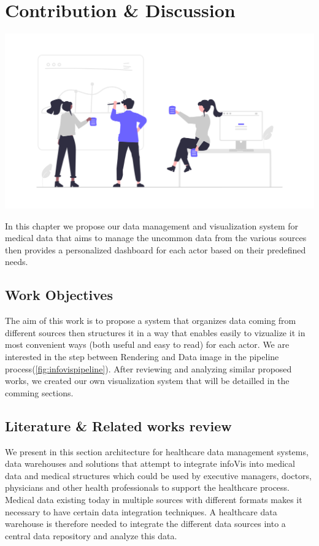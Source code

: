 \chapter{Contribution \& Discussion}
\renewcommand{\thesection}{\arabic{section}}
		




\label{chapitre4}
		
		\includegraphics [width=1 \linewidth, height=0.8\textheight, keepaspectratio] {images/chaptersFigures/contribution.png}
		
	
		
    \newpage
    \thispagestyle{plain}

In this chapter we propose our data management and visualization system for medical data that aims to manage the uncommon data from the various sources then provides a personalized dashboard for each actor based on their predefined needs.




\section{Work Objectives}
The aim of this work is to propose a system that organizes data coming from different sources then structures it in a way that enables easily to vizualize it in most convenient ways (both useful and easy to read) for each actor. We are interested in the step between Rendering and Data image in the pipeline process(\ref{fig:infovispipeline}). After reviewing and analyzing similar proposed works, we created our own visualization system that will be detailled in the comming sections.



\section{Literature \& Related works review}
We present in this section architecture for healthcare data management systems, data warehouses and solutions that attempt to integrate infoVis into medical data and medical structures which could be used by executive managers, doctors, physicians and other health professionals to support the healthcare process.  Medical data existing today in multiple sources with different formats makes it necessary to have certain data integration techniques. A healthcare data warehouse is therefore needed to integrate the different data sources into a central data repository and analyze this data.
\bigbreak

